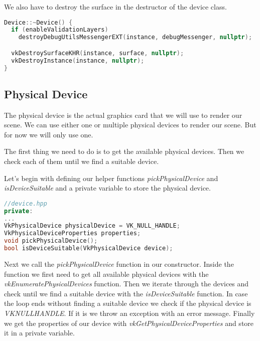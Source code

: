 \documentclass[12pt]{report} \usepackage{preamble}
\begin{document}
We also have to destroy the surface in the destructor of the device class.

\begin{lstlisting}[language=C++]
Device::~Device() {
  if (enableValidationLayers)
    destroyDebugUtilsMessengerEXT(instance, debugMessenger, nullptr);

  vkDestroySurfaceKHR(instance, surface, nullptr);
  vkDestroyInstance(instance, nullptr);
}
\end{lstlisting}

\subsection{Physical Device}

The physical device is the actual graphics card that we will use to render our scene. We
can use either one or multiple physical devices to render our scene. But for now we will
only use one.

The first thing we need to do is to get the available physical devices. Then we check each of them
until we find a suitable device.

Let's begin with defining our helper functions \textit{pickPhysicalDevice} and \textit{isDeviceSuitable}
and a private variable to store the physical device.

\begin{lstlisting}[language=C++]
//device.hpp
private:
...
VkPhysicalDevice physicalDevice = VK_NULL_HANDLE;
VkPhysicalDeviceProperties properties;
void pickPhysicalDevice();
bool isDeviceSuitable(VkPhysicalDevice device);
\end{lstlisting}

Next we call the \textit{pickPhysicalDevice} function in our constructor. Inside the function we
first need to get all available physical devices with the \textit{vkEnumeratePhysicalDevices} function.
Then we iterate through the devices and check until we find a suitable device with the \textit{isDeviceSuitable}
function. In case the loop ends without finding a suitable device we check if the physical device is
\textit{VK\textunderscore NULL\textunderscore HANDLE}. If it is we throw an exception with an error message.
Finally we get the properties of our device with \textit{vkGetPhysicalDeviceProperties} and store it in a private variable.
\end{document}
